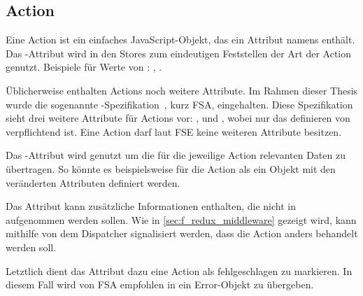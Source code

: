 \subsection{Action}
\label{ssec:gf_action}

Eine Action ist ein einfaches JavaScript-Objekt, das ein Attribut namens
 enthält.  Das -Attribut wird in den Stores zum
eindeutigen Feststellen der Art der Action genutzt.  Beispiele für Werte von
:  , .

Üblicherweise enthalten Actions noch weitere Attribute.  Im Rahmen dieser Thesis
wurde die sogenannte
-Spezifikation~\cite{fsa}, kurz FSA,
eingehalten.  Diese Spezifikation sieht drei weitere Attribute für Actions vor:
,  und , wobei nur das definieren von
 verpflichtend ist.  Eine Action darf laut FSE keine weiteren
Attribute besitzen.

Das -Attribut wird genutzt um die für die jeweilige Action
relevanten Daten zu übertragen.  So könnte es beispielsweise für die Action
 als ein Objekt mit den veränderten Attributen definiert
werden.

Das Attribut  kann zusätzliche Informationen enthalten, die nicht in
 aufgenommen werden sollen.  Wie in \cref{sec:f_redux_middleware}
gezeigt wird, kann mithilfe von  dem Dispatcher signalisiert werden,
dass die Action anders behandelt werden soll.

Letztlich dient das  Attribut dazu eine Action als fehlgeschlagen zu
markieren.  In diesem Fall wird von FSA empfohlen in  ein
Error-Objekt zu übergeben.
